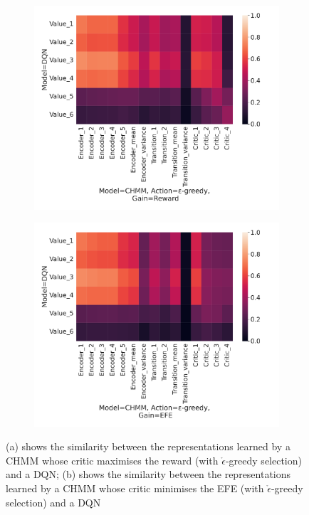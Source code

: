 \documentclass[twoside,11pt]{article}
\begin{document}
\begin{figure}[H]
    \begin{subfigure}{.3\textwidth}
        \centering
        \includegraphics[draft=false,width=\linewidth]{cka_figures/CKA_dqn_1_chmm_73}
        \caption{}\label{sfig:cka-dqn-chmm1}
    \end{subfigure}%
    \begin{subfigure}{.3\textwidth}
        \centering
        \includegraphics[draft=false,width=\linewidth]{cka_figures/CKA_dqn_1_chmm_77}
        \caption{}\label{sfig:cka-dqn-chmm2}
    \end{subfigure}%
    \centering
    \caption{(a) shows the similarity between the representations learned by a CHMM whose critic maximises the reward (with $\mathring{\epsilon}$-greedy selection) and a DQN; (b) shows the similarity between the representations learned by a CHMM whose critic minimises the EFE (with $\mathring{\epsilon}$-greedy selection) and a DQN }
    \label{fig:cka-dqn-chmm}
\end{figure}
\end{document}

